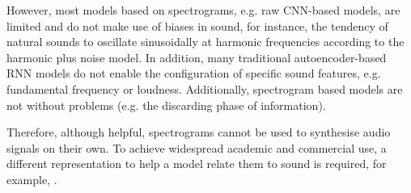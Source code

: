However, most models based on spectrograms, e.g. raw CNN-based models, are limited and do not make use of biases in sound, for instance, the tendency of natural sounds to oscillate sinusoidally at harmonic frequencies according to the harmonic plus noise model. In addition, many traditional autoencoder-based RNN models do not enable the configuration of specific sound features, e.g. fundamental frequency or loudness. Additionally, spectrogram based models are not without problems (e.g. the discarding phase of information).

Therefore, although helpful, spectrograms cannot be used to synthesise audio signals on their own. To achieve widespread academic and commercial use, a different representation to help a model relate them to sound is required, for example, .